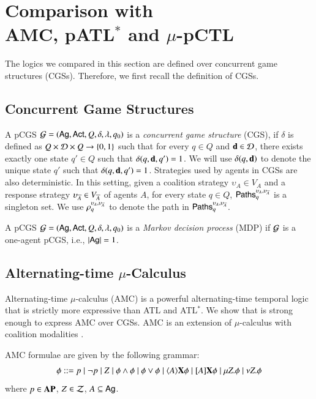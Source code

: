 \section{Comparison with \\AMC, pATL$^*$ and $\mu$-pCTL}

The logics we compared in this section are defined over concurrent game structures (CGSs). %
Therefore, we first recall the definition of CGSs. 

\subsection{Concurrent Game Structures}

A pCGS $\mathcal{G}=(\textsf{Ag},\textsf{Act}, Q, \delta,\lambda,q_0)$ is a \emph{concurrent game structure} (CGS),
if $\delta$ is defined as $Q\times \mathcal{D}\times Q\rightarrow \{0,1\}$ such that for every $q\in Q$ and
${\bf d}\in\mathcal{D}$, there exists exactly one state $q'\in Q$ such that $\delta(q,{\bf d},q')=1$. We will use $\delta(q,{\bf d})$ to denote the unique state $q'$ such that  $\delta(q,{\bf d},q')=1$.
Strategies used by agents in CGSs are also deterministic.
In this setting, given a coalition strategy $\upsilon_A\in V_A$ and a response strategy $\upsilon_{\overline{A}}\in V_{\overline{A}}$ of agents $A$,
for every state $q\in Q$, ${\sf Paths}_q^{\upsilon_A,\upsilon_{\overline{A}}}$ is a singleton set. We use $\rho_q^{\upsilon_A,\upsilon_{\overline{A}}}$ to denote the path
in ${\sf Paths}_q^{\upsilon_A,\upsilon_{\overline{A}}}$.
 
A pCGS $\mathcal{G}=(\textsf{Ag},\textsf{Act}, Q, \delta,\lambda,q_0)$ is a \emph{Markov decision process} (MDP) if $\mathcal{G}$ is a one-agent pCGS, i.e., $|\textsf{Ag}|=1$.


\subsection{Alternating-time $\mu$-Calculus}
Alternating-time $\mu$-calculus (AMC) is a powerful alternating-time temporal logic that is strictly more expressive than ATL and ATL$^*$.
We show that \pamcs is strong enough to express AMC over CGSs.
AMC is an extension of $\mu$-calculus with coalition modalities \cite{AHK02}.

\begin{definition}\cite{AHK02} AMC formulae are given by the following grammar:
\[\phi::= p \mid \neg p \mid Z \mid \phi\wedge \phi \mid \phi\vee \phi \mid \langle{A}\rangle{\bf X} \phi \mid  [{A}]{\bf X} \phi \mid  \mu Z.\phi\mid \nu Z.\phi\]
where $p\in {\bf AP}$, $Z\in \mathcal{Z}$, $A\subseteq  \textsf{Ag}$.
\end{definition}


